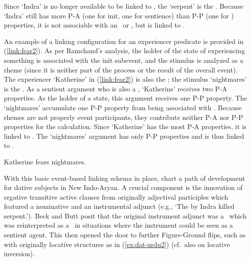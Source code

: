 \documentclass[output=paper,hidelinks]{langscibook}
\begin{document}
\noindent Since `Indra' is no longer available to be linked to \SUBJ, the `serpent' is the \SUBJ. Because `Indra' still has more P-A (one for init, one for sentience) than P-P (one for \GR) properties, it is not associable with an \OBJ\ or \OBJTHETA, but is linked to \OBL. 

An example of a linking configuration for an experiencer predicate is provided in (\ref{link:fear2}). As per Ramchand's analysis, the holder of the state of experiencing something is associated with the init subevent, and the stimulus is analyzed as a rheme (since it is neither part of the process or the result of the overall event). The experiencer `Katherine' in (\ref{link:fear2}) is also the \FIG; the stimulus `nightmares' is the \GR.  As a sentient argument who is also a \FIG, `Katherine' receives two P-A properties.  As the holder of a state, this argument receives one P-P property.  The `nightmares' accumulate one P-P property from being associated with \GR.  Because rhemes are not properly event participants, they contribute neither P-A nor P-P properties for the calculation. Since `Katherine' has the most P-A properties, it is linked to \SUBJ. The `nightmares' argument has only P-P properties and is thus linked to \OBJ. 


\ea \label{link:fear2}
Katherine fears nightmares.

\hspace{1.1cm}
\vspace{2ex}
\z 

With this basic event-based linking schema in place, \citet{beck-butt2021} chart a path of development for dative subjects in New Indo-Aryan. A crucial component is the innovation of ergative transitive active clauses from originally adjectival participles which featured a nominative  and an instrumental adjunct (e.g., `The by Indra killed serpent.').  Beck and Butt posit that the original instrument adjunct was a \GR\ which was reinterpreted as a \FIG\ in situations where the instrument could be seen as a sentient agent. This then opened the door to further Figure-Ground flips, such as with originally locative structures as in (\ref{ex:dat-urdu2}) (cf.~also \citealt{bresnan1989locative,landau10} on locative inversion). 
\end{document}
